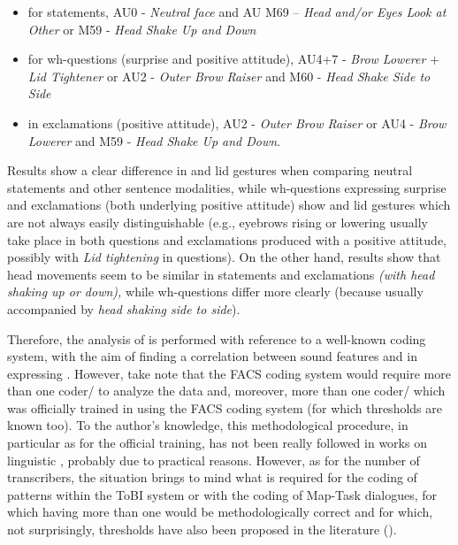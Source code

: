 \documentclass[output=paper]{langsci/langscibook}
\begin{document}
\begin{itemize}
\item  for statements, AU0 - \textit{Neutral face} and AU M69 – \textit{Head and\slash or Eyes Look at Other} or M59 - \textit{Head Shake Up and Down} 
\item  for wh-questions (surprise and positive attitude), AU4+7 - \textit{Brow Lowerer} + \textit{Lid Tightener} or AU2 - \textit{Outer Brow Raiser}  and M60 - \textit{Head Shake Side to Side} 
\item  in exclamations (positive attitude), AU2 - \textit{Outer Brow Raiser} or AU4 - \textit{Brow Lowerer} and M59 - \textit{Head Shake Up and Down}. 
\end{itemize}

Results show a clear difference in  and lid gestures when comparing neutral statements and other sentence modalities, while wh-questions expressing surprise and exclamations (both underlying positive attitude) show  and lid gestures which are not always easily distinguishable (e.g., eyebrows rising or lowering usually take place in both questions and exclamations produced with a positive attitude, possibly with \textit{Lid tightening} in questions). On the other hand, results show that head movements seem to be similar in statements and exclamations \textit{(with head shaking up or down),} while wh-questions differ more clearly (because usually accompanied by \textit{head shaking side to side}). 

Therefore, the analysis of  is performed with reference to a well-known coding system, with the aim of finding a correlation between  sound features and  in expressing . However, take note that the FACS coding system would require more than one coder\slash {} to analyze the data and, moreover, more than one coder\slash {} which was officially trained in using the FACS coding system (for which  thresholds are known too). To the author's knowledge, this methodological procedure, in particular as for the official training, has not been really followed in works on linguistic , probably due to practical reasons. However, as for the number of transcribers, the situation brings to mind what is required for the coding of  patterns within the ToBI system or with the coding of Map-Task dialogues, for which having more than one  would be methodologically correct and for which, not surprisingly,  thresholds have also been proposed in the literature (\citealt{Silverman1992,Beckman1997,Isard.Carletta1995}).\clearpage
\end{document}
